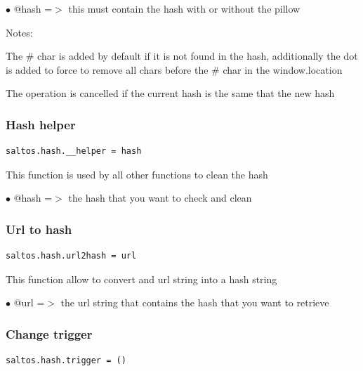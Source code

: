 \documentclass[a4paper]{article}
\begin{document}
\begin{compactitem}
\item[\color{myblue}$\bullet$] @hash =$>$ this must contain the hash with or without the pillow
\end{compactitem}

Notes:

The \# char is added by default if it is not found in the hash, additionally the dot is
added to force to remove all chars before the \# char in the window.location

The operation is cancelled if the current hash is the same that the new hash

\hypertarget{toc255}{}
\subsubsection{Hash helper}

\begin{lstlisting}
saltos.hash.__helper = hash
\end{lstlisting}

This function is used by all other functions to clean the hash

\begin{compactitem}
\item[\color{myblue}$\bullet$] @hash =$>$ the hash that you want to check and clean
\end{compactitem}

\hypertarget{toc256}{}
\subsubsection{Url to hash}

\begin{lstlisting}
saltos.hash.url2hash = url
\end{lstlisting}

This function allow to convert and url string into a hash string

\begin{compactitem}
\item[\color{myblue}$\bullet$] @url =$>$ the url string that contains the hash that you want to retrieve
\end{compactitem}

\hypertarget{toc257}{}
\subsubsection{Change trigger}

\begin{lstlisting}
saltos.hash.trigger = ()
\end{lstlisting}
\end{document}
